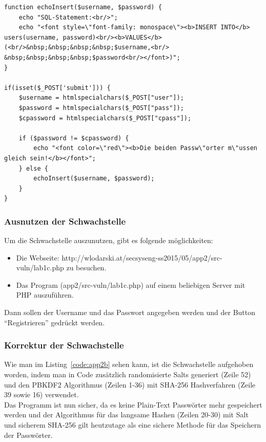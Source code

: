 \documentclass[12pt,a4paper,titlepage,oneside]{scrartcl}
\begin{document}
\begin{lstlisting}[caption=app2 mit Schwachstelle,label=code:app2a,style=c]
function echoInsert($username, $password) {
    echo "SQL-Statement:<br/>";
    echo "<font style=\"font-family: monospace\"><b>INSERT INTO</b> users(username, password)<br/><b>VALUES</b>(<br/>&nbsp;&nbsp;&nbsp;&nbsp;$username,<br/> &nbsp;&nbsp;&nbsp;&nbsp;$password<br/></font>)";
}

if(isset($_POST['submit'])) {
    $username = htmlspecialchars($_POST["user"]);
    $password = htmlspecialchars($_POST["pass"]);
    $cpassword = htmlspecialchars($_POST["cpass"]);

    if ($password != $cpassword) {
        echo "<font color=\"red\"><b>Die beiden Passw\"orter m\"ussen gleich sein!</b></font>";
    } else {
        echoInsert($username, $password);
    }
}
\end{lstlisting}

\subsubsection{Ausnutzen der Schwachstelle}

Um die Schwachstelle auszunutzen, gibt es folgende möglichkeiten:
\begin{itemize}
	\item Die Webseite: http://wlodarski.at/secsyseng-ss2015/05/app2/src-vuln/lab1c.php zu besuchen.
	\item Das Program (app2/src-vuln/lab1c.php) auf einem beliebigen Server mit PHP auszuführen.
\end{itemize}
Dann sollen der Username und das Passwort angegeben werden und der Button "`Registrieren"' gedrückt werden.

\subsubsection{Korrektur der Schwachstelle}

Wie man im Listing~\ref*{code:app2b} sehen kann, ist die Schwachstelle aufgehoben worden,
indem man in Code zusätzlich randomisierte Salts generiert (Zeile 52) und den
PBKDF2 Algorithmus (Zeilen 1-36) mit SHA-256 Hashverfahren (Zeile 39 sowie 16) verwendet. \\[0.5em]
Das Programm ist nun sicher, da es keine Plain-Text Passwörter mehr gespeichert werden
und der Algorithmus für das langsame Hashen (Zeilen 20-30) mit Salt und sicherem SHA-256
gilt heutzutage als eine sichere Methode für das Speichern der Passwörter.
\end{document}
